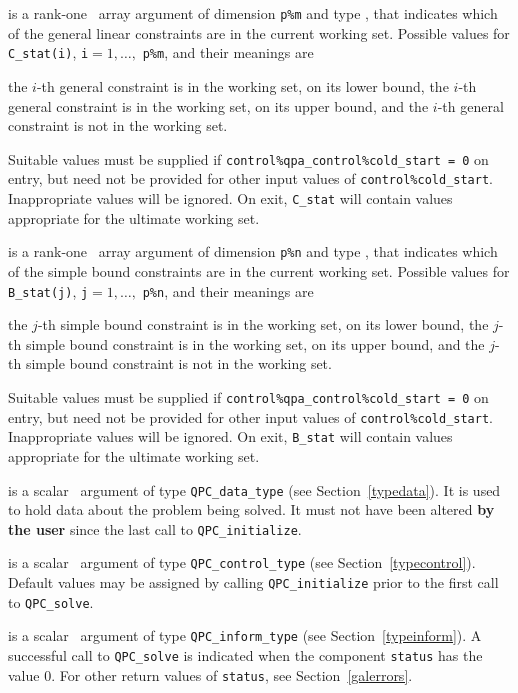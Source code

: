 \documentclass{galahad}
\newcommand{\packagename}{QPC}
\begin{document}
\begin{description}
 is a rank-one \intentinout\ array argument of dimension {\tt p\%m}
and type \integer, that indicates which of the general linear
constraints are in the current working set. Possible values for 
{\tt C\_stat(i)}, {\tt i}$=1, \ldots ,$ {\tt p\%m}, and their meanings are
\begin{description}
 the $i$-th general constraint 
is in the working set, on its lower bound,
 the $i$-th general constraint 
is in the working set, on its upper bound, and
  the $i$-th general constraint is not in the working set.
\end{description}
Suitable values must be supplied if 
{\tt control\%qpa\_control\%cold\_start = 0} on entry,
but need not be provided for other input values of {\tt control\%cold\_start}.
Inappropriate values will be ignored.
On exit, {\tt C\_stat} will contain values appropriate for the ultimate
working set.

 is a rank-one \intentinout\ array argument of dimension {\tt p\%n}
and type \integer, that indicates which of the simple bound 
constraints are in the current working set. Possible values for 
{\tt B\_stat(j)}, {\tt j}$=1, \ldots ,$ {\tt p\%n}, and their meanings are
\begin{description}
 the $j$-th simple bound constraint 
is in the working set, on its lower bound,
 the $j$-th simple bound constraint 
is in the working set, on its upper bound, and
  the $j$-th simple bound constraint is not in the working set.
\end{description}
Suitable values must be supplied if 
{\tt control\%qpa\_control\%cold\_start = 0} on entry,
but need not be provided for other input values of {\tt control\%cold\_start}.
Inappropriate values will be ignored.
On exit, {\tt B\_stat} will contain values appropriate for the ultimate
working set.

 is a scalar \intentinout\ argument of type 
{\tt \packagename\_data\_type}
(see Section~\ref{typedata}). It is used to hold data about the problem being 
solved. It must not have been altered {\bf by the user} since the last call to 
{\tt \packagename\_initialize}.

 is a scalar \intentin\ argument of type 
{\tt \packagename\_control\_type}
(see Section~\ref{typecontrol}). Default values may be assigned by calling 
{\tt \packagename\_initialize} prior to the first call to 
{\tt \packagename\_solve}.

 is a scalar \intentinout\ argument of type 
{\tt \packagename\_inform\_type}
(see Section~\ref{typeinform}). A successful call to
{\tt \packagename\_solve}
is indicated when the  component {\tt status} has the value 0. 
For other return values of {\tt status}, see Section~\ref{galerrors}.

\end{description}
\end{document}
